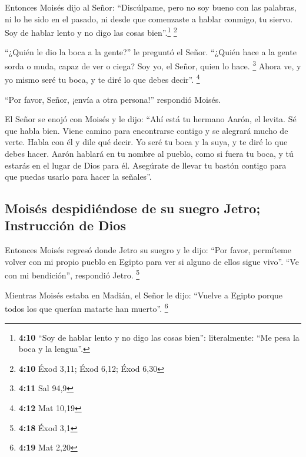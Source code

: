  Entonces Moisés dijo al Señor: ``Discúlpame, pero no soy
bueno con las palabras, ni lo he sido en el pasado, ni desde que
comenzaste a hablar conmigo, tu siervo. Soy de hablar lento y no digo
las cosas bien''.\footnote{\textbf{4:10} ``Soy de hablar lento y no digo
  las cosas bien'': literalmente: ``Me pesa la boca y la lengua''.}
\footnote{\textbf{4:10} Éxod 3,11; Éxod 6,12; Éxod 6,30}

 ``¿Quién le dio la boca a la gente?'' le preguntó el
Señor. ``¿Quién hace a la gente sorda o muda, capaz de ver o ciega? Soy
yo, el Señor, quien lo hace. \footnote{\textbf{4:11} Sal 94,9}
 Ahora ve, y yo mismo seré tu boca, y te diré lo que
debes decir''. \footnote{\textbf{4:12} Mat 10,19}

 ``Por favor, Señor, ¡envía a otra persona!'' respondió
Moisés.

 El Señor se enojó con Moisés y le dijo: ``Ahí está tu
hermano Aarón, el levita. Sé que habla bien. Viene camino para
encontrarse contigo y se alegrará mucho de verte.  Habla
con él y dile qué decir. Yo seré tu boca y la suya, y te diré lo que
debes hacer.  Aarón hablará en tu nombre al pueblo, como
si fuera tu boca, y tú estarás en el lugar de Dios para él.
 Asegúrate de llevar tu bastón contigo para que puedas
usarlo para hacer la señales''.

\hypertarget{moisuxe9s-despidiuxe9ndose-de-su-suegro-jetro-instrucciuxf3n-de-dios}{%
\subsection{Moisés despidiéndose de su suegro Jetro; Instrucción de
Dios}\label{moisuxe9s-despidiuxe9ndose-de-su-suegro-jetro-instrucciuxf3n-de-dios}}

 Entonces Moisés regresó donde Jetro su suegro y le dijo:
``Por favor, permíteme volver con mi propio pueblo en Egipto para ver si
alguno de ellos sigue vivo''. ``Ve con mi bendición'', respondió Jetro.
\footnote{\textbf{4:18} Éxod 3,1}

 Mientras Moisés estaba en Madián, el Señor le dijo:
``Vuelve a Egipto porque todos los que querían matarte han muerto''.
\footnote{\textbf{4:19} Mat 2,20}

